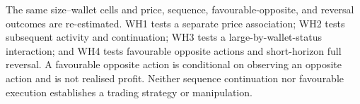 The same size--wallet cells and price, sequence, favourable-opposite, and
reversal outcomes are re-estimated. WH1 tests a separate price association; WH2
tests subsequent activity and continuation; WH3 tests a large-by-wallet-status
interaction; and WH4 tests favourable opposite actions and short-horizon full
reversal. A favourable opposite action is conditional on observing an opposite
action and is not realised profit. Neither sequence continuation nor favourable
execution establishes a trading strategy or manipulation.

